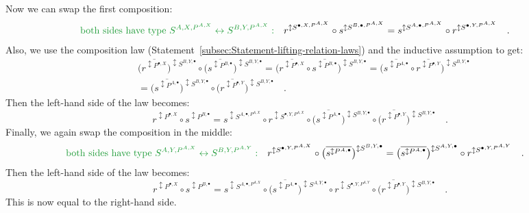 Now we can swap the first composition:
\begin{align*}
{\color{greenunder}\text{both sides have type }S^{A,X,P^{A,X}}\leftrightarrow S^{B,Y,P^{A,X}}:}\quad & r^{\updownarrow S^{\bullet,X,P^{A,X}}}\circ s^{\updownarrow S^{B,\bullet,P^{A,X}}}=s^{\updownarrow S^{A,\bullet,P^{A,X}}}\circ r^{\updownarrow S^{\bullet,Y,P^{A,X}}}\quad.
\end{align*}
Also, we use the composition law (Statement~\ref{subsec:Statement-lifting-relation-laws})
and the inductive assumption to get:
\begin{align*}
 & \big(\overline{r^{\updownarrow P^{\bullet,X}}}\big)^{\updownarrow S^{B,Y,\bullet}}\circ\big(\overline{s^{\updownarrow P^{B,\bullet}}}\big)^{\updownarrow S^{B,Y,\bullet}}=\big(\overline{r^{\updownarrow P^{\bullet,X}}}\circ\overline{s^{\updownarrow P^{B,\bullet}}}\big)^{\updownarrow S^{B,Y,\bullet}}=\big(\overline{s^{\updownarrow P^{A,\bullet}}}\circ\overline{r^{\updownarrow P^{\bullet,Y}}}\big)^{\updownarrow S^{B,Y,\bullet}}\\
 & =\big(\overline{s^{\updownarrow P^{A,\bullet}}}\big)^{\updownarrow S^{B,Y,\bullet}}\circ\big(\overline{r^{\updownarrow P^{\bullet,Y}}}\big)^{\updownarrow S^{B,Y,\bullet}}\quad.
\end{align*}
Then the left-hand side of the law becomes:
\[
r^{\updownarrow P^{\bullet,X}}\circ s^{\updownarrow P^{B,\bullet}}=s^{\updownarrow S^{A,\bullet,P^{A,X}}}\circ r^{\updownarrow S^{\bullet,Y,P^{A,X}}}\circ\big(\overline{s^{\updownarrow P^{A,\bullet}}}\big)^{\updownarrow S^{B,Y,\bullet}}\circ\big(\overline{r^{\updownarrow P^{\bullet,Y}}}\big)^{\updownarrow S^{B,Y,\bullet}}\quad.
\]
Finally, we again swap the composition in the middle:
\begin{align*}
{\color{greenunder}\text{both sides have type }S^{A,Y,P^{A,X}}\leftrightarrow S^{B,Y,P^{A,Y}}:}\quad & r^{\updownarrow S^{\bullet,Y,P^{A,X}}}\circ\big(\overline{s^{\updownarrow P^{A,\bullet}}}\big)^{\updownarrow S^{B,Y,\bullet}}=\big(\overline{s^{\updownarrow P^{A,\bullet}}}\big)^{\updownarrow S^{A,Y,\bullet}}\circ r^{\updownarrow S^{\bullet,Y,P^{A,Y}}}\quad.
\end{align*}
Then the left-hand side of the law becomes:
\[
r^{\updownarrow P^{\bullet,X}}\circ s^{\updownarrow P^{B,\bullet}}=s^{\updownarrow S^{A,\bullet,P^{A,X}}}\circ\big(\overline{s^{\updownarrow P^{A,\bullet}}}\big)^{\updownarrow S^{A,Y,\bullet}}\circ r^{\updownarrow S^{\bullet,Y,P^{A,Y}}}\circ\big(\overline{r^{\updownarrow P^{\bullet,Y}}}\big)^{\updownarrow S^{B,Y,\bullet}}\quad.
\]
This is now equal to the right-hand side.

